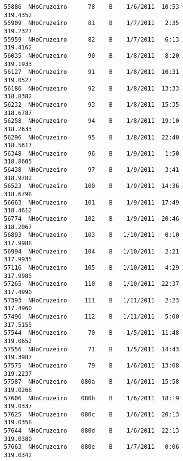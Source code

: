 \documentclass[a4paper,11pt,final]{article}
\begin{document}
\begin{Verbatim}[commandchars=\\\{\},frame=leftline,fontsize=\small, xleftmargin=0.5em]
55886  NHoCruzeiro      78    B    1/6/2011  10:53
319.4352
55909  NHoCruzeiro      81    B    1/7/2011   2:35
319.2327
55959  NHoCruzeiro      82    B    1/7/2011   6:13
319.4162
56035  NHoCruzeiro      90    B    1/8/2011   8:20
319.1933
56127  NHoCruzeiro      91    B    1/8/2011  10:31
319.0527
56186  NHoCruzeiro      92    B    1/8/2011  13:33
318.8382
56232  NHoCruzeiro      93    B    1/8/2011  15:35
318.6787
56258  NHoCruzeiro      94    B    1/8/2011  19:10
318.2633
56296  NHoCruzeiro      95    B    1/8/2011  22:40
318.5617
56348  NHoCruzeiro      96    B    1/9/2011   1:50
318.8605
56438  NHoCruzeiro      97    B    1/9/2011   3:41
318.9782
56523  NHoCruzeiro     100    B    1/9/2011  14:36
318.6798
56663  NHoCruzeiro     101    B    1/9/2011  17:49
318.4612
56774  NHoCruzeiro     102    B    1/9/2011  20:46
318.2067
56893  NHoCruzeiro     103    B   1/10/2011   0:10
317.9988
56994  NHoCruzeiro     104    B   1/10/2011   2:21
317.9935
57116  NHoCruzeiro     105    B   1/10/2011   4:29
317.9985
57265  NHoCruzeiro     110    B   1/10/2011  22:37
317.4990
57393  NHoCruzeiro     111    B   1/11/2011   2:23
317.4960
57496  NHoCruzeiro     112    B   1/11/2011   5:00
317.5155
57544  NHoCruzeiro      70    B    1/5/2011  11:48
319.0652
57556  NHoCruzeiro      71    B    1/5/2011  14:43
319.3987
57575  NHoCruzeiro      79    B    1/6/2011  13:08
319.2237
57587  NHoCruzeiro    080a    B    1/6/2011  15:58
319.0268
57606  NHoCruzeiro    080b    B    1/6/2011  18:19
319.0337
57625  NHoCruzeiro    080c    B    1/6/2011  20:13
319.0358
57644  NHoCruzeiro    080d    B    1/6/2011  22:13
319.0380
57663  NHoCruzeiro    080e    B    1/7/2011   0:06
319.0342


\end{Verbatim}
\end{document}
